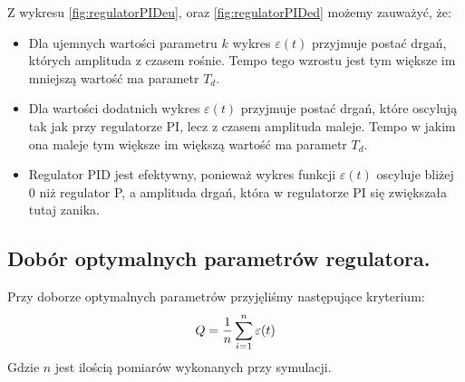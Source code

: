 \documentclass[a4paper,10pt]{article}
\begin{document}
\newpage Z wykresu \ref{fig:regulatorPIDeu}, oraz \ref{fig:regulatorPIDed} możemy zauważyć, że:
\begin{itemize}
	\item Dla ujemnych wartości parametru $k$ wykres $\varepsilon(t)$ przyjmuje postać drgań, których amplituda z czasem rośnie. Tempo tego wzrostu jest tym większe im mniejszą wartość ma parametr $T_{d}$.
	\item Dla wartości dodatnich wykres $\varepsilon(t)$ przyjmuje postać drgań, które oscylują tak jak przy regulatorze PI, lecz z czasem amplituda maleje. Tempo w jakim ona maleje tym większe im większą wartość ma parametr $T_{d}$.
	\item Regulator PID jest efektywny, ponieważ wykres funkcji $\varepsilon(t)$ oscyluje bliżej 0 niż regulator P, a amplituda drgań, która w regulatorze PI się zwiększała tutaj zanika.
\end{itemize}

%
%
\subsection{Dobór optymalnych parametrów regulatora.}\label{sec:zad2}
Przy doborze optymalnych parametrów przyjęliśmy następujące kryterium:
\begin{equation} \label{eqn:transOS}
	Q = {1 \over n}\sum_{i=1}^{n} \varepsilon(t)
\end{equation}
Gdzie $n$ jest ilością pomiarów wykonanych przy symulacji.
\end{document}
